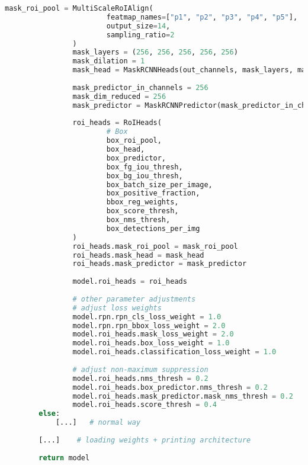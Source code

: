 \begin{lstlisting}[language=Python,caption=Random Augmentation of the Background using cv2 in Python, label=lst:bg-augmentation]
				mask_roi_pool = MultiScaleRoIAlign(
						featmap_names=["p1", "p2", "p3", "p4", "p5"], 
						output_size=14, 
						sampling_ratio=2
				)
				mask_layers = (256, 256, 256, 256, 256)
				mask_dilation = 1
				mask_head = MaskRCNNHeads(out_channels, mask_layers, mask_dilation)
				
				mask_predictor_in_channels = 256  
				mask_dim_reduced = 256
				mask_predictor = MaskRCNNPredictor(mask_predictor_in_channels, mask_dim_reduced, 2)
				
				roi_heads = RoIHeads(
						# Box
						box_roi_pool,
						box_head,
						box_predictor,
						box_fg_iou_thresh,
						box_bg_iou_thresh,
						box_batch_size_per_image,
						box_positive_fraction,
						bbox_reg_weights,
						box_score_thresh,
						box_nms_thresh,
						box_detections_per_img
				)
				roi_heads.mask_roi_pool = mask_roi_pool
				roi_heads.mask_head = mask_head
				roi_heads.mask_predictor = mask_predictor
				
				model.roi_heads = roi_heads
				
				# other parameter adjustments
				# adjust loss weights
				model.rpn.rpn_cls_loss_weight = 1.0
				model.rpn.rpn_bbox_loss_weight = 2.0
				model.roi_heads.mask_loss_weight = 2.0
				model.roi_heads.box_loss_weight = 1.0
				model.roi_heads.classification_loss_weight = 1.0
				
				# adjust non-maximum suppression
				model.roi_heads.nms_thresh = 0.2
				model.roi_heads.box_predictor.nms_thresh = 0.2 
				model.roi_heads.mask_predictor.mask_nms_thresh = 0.2 
				model.roi_heads.score_thresh = 0.4  
		else:
			[...]   # normal way
		
		[...]    # loading weights + printing architecture
		
		return model
	\end{lstlisting}
	
	


